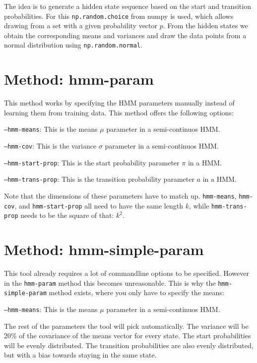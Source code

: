 The idea is to generate a hidden state sequence based on the start and transition probabilities. For this \texttt{np.random.choice} from numpy is used, which allows drawing from a set with a given probability vector $p$. From the hidden states we obtain the corresponding means and variances and draw the data points from a normal distribution using \texttt{np.random.normal}.

\section{Method: hmm-param}

This method works by specifying the HMM parameters manually instead of learning them from training data. This method offers the following options: 

\texttt{---hmm-means}: This is the means $\mu$ parameter in a semi-continuos HMM. 

\texttt{---hmm-cov}: This is the variance $\sigma$ parameter in a semi-continuos HMM. 

\texttt{---hmm-start-prop}: This is the start probability parameter $\pi$ in a HMM. 

\texttt{---hmm-trans-prop}: This is the transition probability parameter $a$ in a HMM. 

Note that the dimensions of these parameters have to match up. \texttt{hmm-means}, \texttt{hmm-cov}, and \texttt{hmm-start-prop} all need to have the same length $k$, while \texttt{hmm-trans-prop} needs to be the square of that: $k^2$. 

\section{Method: hmm-simple-param}

This tool already requires a lot of commandline options to be specified. However in the \texttt{hmm-param} method this becomes unreasonable. This is why the \texttt{hmm-simple-param} method exists, where you only have to specify the means: 

\texttt{---hmm-means}: This is the means $\mu$ parameter in a semi-continuos HMM. 

The rest of the parameters the tool will pick automatically. The variance will be 20\% of the covariance of the means vector for every state. The start probabilities will be evenly distributed. The transition probabilities are also evenly distributed, but with a bias towards staying in the same state. 

